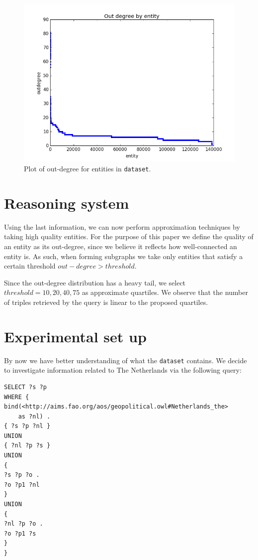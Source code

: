 \documentclass[runningheads,a4paper]{../../StyleFiles/llncs}
\begin{document}
\begin{figure}[h]
	\centering
	\includegraphics[width=.7\textwidth]{img/dataset_outdegree.png}
	\caption{Plot of out-degree for entities in \texttt{dataset}.}
	\label{fig:outdegree}
\end{figure}

\section{Reasoning system}
Using the last information, we can now perform approximation techniques by taking high quality entities. For the purpose of this paper we define the quality of an entity as its out-degree, since we believe it reflects how well-connected an entity is. As such, when forming subgraphs we take only entities that satisfy a certain threshold $ out-degree > threshold$.

Since the out-degree distribution has a heavy tail, we select $threshold = 10, 20, 40, 75$ as approximate quartiles. We observe that the number of triples retrieved by the query is linear to the proposed quartiles.


\section{Experimental set up}
By now we have better understanding of what the \texttt{dataset} contains. We decide to investigate information related to The Netherlands via the following query:

\begin{lstlisting}[captionpos=b, caption=SPARQL query for calculating out degree of entities, label=lst:sparql, basicstyle=\ttfamily\small,frame=bt]
SELECT ?s ?p
WHERE {
bind(<http://aims.fao.org/aos/geopolitical.owl#Netherlands_the> 
	as ?nl) .
{ ?s ?p ?nl }
UNION
{ ?nl ?p ?s }
UNION
{
?s ?p ?o .
?o ?p1 ?nl
}
UNION
{
?nl ?p ?o .
?o ?p1 ?s
}
}
\end{lstlisting}
\end{document}
